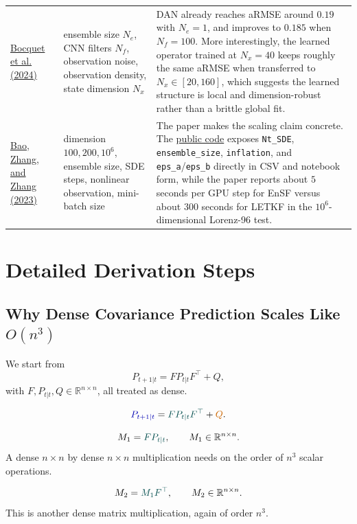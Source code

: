 \documentclass[12pt,a4paper]{article}
\begin{document}
\begin{longtable}{>{\raggedright\arraybackslash}p{3.2cm} >{\raggedright\arraybackslash}p{3.8cm} >{\raggedright\arraybackslash}p{6.4cm}}
\href{https://arxiv.org/abs/2408.04739}{Bocquet et al. (2024)} & ensemble size \(N_e\), CNN filters \(N_f\), observation noise, observation density, state dimension \(N_x\) & DAN already reaches aRMSE around \(0.19\) with \(N_e=1\), and improves to \(0.185\) when \(N_f=100\). More interestingly, the learned operator trained at \(N_x=40\) keeps roughly the same aRMSE when transferred to \(N_x \in [20,160]\), which suggests the learned structure is local and dimension-robust rather than a brittle global fit. \\
\href{https://arxiv.org/abs/2309.00983}{Bao, Zhang, and Zhang (2023)} & dimension \(100,200,10^6\), ensemble size, SDE steps, nonlinear observation, mini-batch size & The paper makes the scaling claim concrete. The \href{https://github.com/zezhongzhang/EnSF}{public code} exposes \texttt{Nt\_SDE}, \texttt{ensemble\_size}, \texttt{inflation}, and \texttt{eps\_a}/\texttt{eps\_b} directly in CSV and notebook form, while the paper reports about \(5\) seconds per GPU step for EnSF versus about \(300\) seconds for LETKF in the \(10^6\)-dimensional Lorenz-96 test. \\
\bottomrule
\end{longtable}

\section{Detailed Derivation Steps}\label{app:derivation-steps}

\subsection{Why Dense Covariance Prediction Scales Like \(O(n^3)\)}\label{app:derivation-cost}

We start from
\[
P_{t+1|t} = F P_{t|t} F^\top + Q,
\]
with \(F, P_{t|t}, Q \in \mathbb{R}^{n \times n}\), all treated as dense.

\[
\eqfocusa{P_{t+1|t}} = \eqfocusb{F P_{t|t} F^\top} + \eqfocusc{Q}.
\]

\[
M_1 = \eqfocusb{F P_{t|t}}, \qquad M_1 \in \mathbb{R}^{n \times n}.
\]
A dense \(n \times n\) by dense \(n \times n\) multiplication needs on the order of \(n^3\) scalar operations.

\[
M_2 = \eqfocusb{M_1 F^\top}, \qquad M_2 \in \mathbb{R}^{n \times n}.
\]
This is another dense matrix multiplication, again of order \(n^3\).
\end{document}
